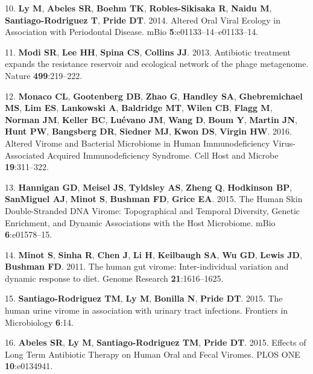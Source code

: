 \documentclass[12pt,]{article}
\begin{document}
\hypertarget{ref-Ly:2014ew}{}
10. \textbf{Ly M}, \textbf{Abeles SR}, \textbf{Boehm TK},
\textbf{Robles-Sikisaka R}, \textbf{Naidu M}, \textbf{Santiago-Rodriguez
T}, \textbf{Pride DT}. 2014. Altered Oral Viral Ecology in Association
with Periodontal Disease. mBio \textbf{5}:e01133--14--e01133--14.

\hypertarget{ref-Modi:2013fia}{}
11. \textbf{Modi SR}, \textbf{Lee HH}, \textbf{Spina CS},
\textbf{Collins JJ}. 2013. Antibiotic treatment expands the resistance
reservoir and ecological network of the phage metagenome. Nature
\textbf{499}:219--222.

\hypertarget{ref-Monaco:2016ita}{}
12. \textbf{Monaco CL}, \textbf{Gootenberg DB}, \textbf{Zhao G},
\textbf{Handley SA}, \textbf{Ghebremichael MS}, \textbf{Lim ES},
\textbf{Lankowski A}, \textbf{Baldridge MT}, \textbf{Wilen CB},
\textbf{Flagg M}, \textbf{Norman JM}, \textbf{Keller BC},
\textbf{Luévano JM}, \textbf{Wang D}, \textbf{Boum Y}, \textbf{Martin
JN}, \textbf{Hunt PW}, \textbf{Bangsberg DR}, \textbf{Siedner MJ},
\textbf{Kwon DS}, \textbf{Virgin HW}. 2016. Altered Virome and Bacterial
Microbiome in Human Immunodeficiency Virus-Associated Acquired
Immunodeficiency Syndrome. Cell Host and Microbe \textbf{19}:311--322.

\hypertarget{ref-Hannigan:2015fz}{}
13. \textbf{Hannigan GD}, \textbf{Meisel JS}, \textbf{Tyldsley AS},
\textbf{Zheng Q}, \textbf{Hodkinson BP}, \textbf{SanMiguel AJ},
\textbf{Minot S}, \textbf{Bushman FD}, \textbf{Grice EA}. 2015. The
Human Skin Double-Stranded DNA Virome: Topographical and Temporal
Diversity, Genetic Enrichment, and Dynamic Associations with the Host
Microbiome. mBio \textbf{6}:e01578--15.

\hypertarget{ref-Minot:2011ez}{}
14. \textbf{Minot S}, \textbf{Sinha R}, \textbf{Chen J}, \textbf{Li H},
\textbf{Keilbaugh SA}, \textbf{Wu GD}, \textbf{Lewis JD},
\textbf{Bushman FD}. 2011. The human gut virome: Inter-individual
variation and dynamic response to diet. Genome Research
\textbf{21}:1616--1625.

\hypertarget{ref-SantiagoRodriguez:2015gd}{}
15. \textbf{Santiago-Rodriguez TM}, \textbf{Ly M}, \textbf{Bonilla N},
\textbf{Pride DT}. 2015. The human urine virome in association with
urinary tract infections. Frontiers in Microbiology \textbf{6}:14.

\hypertarget{ref-Abeles:2015dy}{}
16. \textbf{Abeles SR}, \textbf{Ly M}, \textbf{Santiago-Rodriguez TM},
\textbf{Pride DT}. 2015. Effects of Long Term Antibiotic Therapy on
Human Oral and Fecal Viromes. PLOS ONE \textbf{10}:e0134941.
\end{document}
